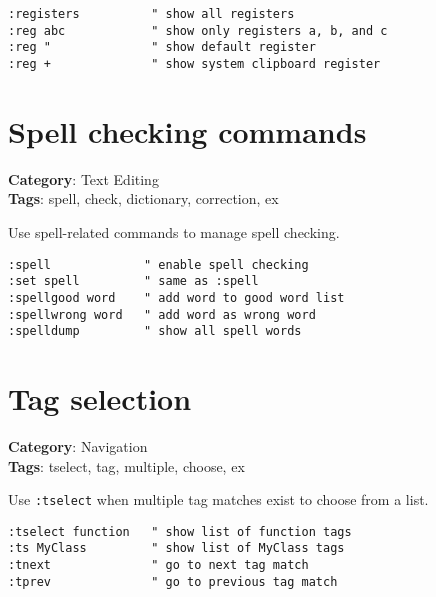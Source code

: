 {{{{{\begin{Exa*}{}
\begin{Verbatim}[fontsize=\footnotesize, breaklines, breakanywhere]
:registers          " show all registers
:reg abc            " show only registers a, b, and c
:reg "              " show default register
:reg +              " show system clipboard register
\end{Verbatim}
\end{Exa*}

\section{Spell checking commands}

\textbf{Category}: Text Editing\\ \textbf{Tags}: spell, check, dictionary, correction, ex
\vspace{0.5cm}

Use spell-related commands to manage spell checking.

\begin{Exa*}{}
\begin{Verbatim}[fontsize=\footnotesize, breaklines, breakanywhere]
:spell             " enable spell checking
:set spell         " same as :spell
:spellgood word    " add word to good word list
:spellwrong word   " add word as wrong word
:spelldump         " show all spell words
\end{Verbatim}
\end{Exa*}

\section{Tag selection}

\textbf{Category}: Navigation\\ \textbf{Tags}: tselect, tag, multiple, choose, ex
\vspace{0.5cm}

Use {\footnotesize \Verb§:tselect§} when multiple tag matches exist to choose from a list.

\begin{Exa*}{}
\begin{Verbatim}[fontsize=\footnotesize, breaklines, breakanywhere]
:tselect function   " show list of function tags
:ts MyClass         " show list of MyClass tags
:tnext              " go to next tag match
:tprev              " go to previous tag match
\end{Verbatim}
\end{Exa*}

}}}}}

